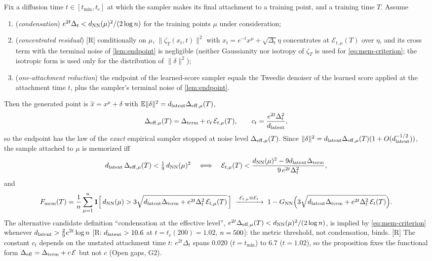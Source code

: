 \begin{proposition}\label{prop:bridge}
Fix a diffusion time $t\in[t_{\min},t_c]$ at which the sampler makes its final attachment to a training point, and a training time $T$. Assume
\begin{enumerate}
\item[(B1)] (\emph{condensation}) $e^{2t}\Delta_t<d_{\rm NN}(\mu)^2/(2\log n)$ for the training points $\mu$ under consideration;
\item[(B2)] (\emph{concentrated residual}) [R] conditionally on $\mu$, $\|\zeta_T(x_t,t)\|^2$ with $x_t=e^{-t}x^\mu+\sqrt{\Delta_t}\eta$ concentrates at $\mathcal E_{t,\mu}(T)$ over $\eta$, and its cross term with the terminal noise of \cref{lem:endpoint} is negligible (neither Gaussianity nor isotropy of $\zeta_T$ is used for \eqref{eq:mem-criterion}; the isotropic form is used only for the distribution of $\|\delta\|^2$);
\item[(B3)] (\emph{one-attachment reduction}) the endpoint of the learned-score sampler equals the Tweedie denoiser of the learned score applied at the attachment time $t$, plus the sampler's terminal noise of \cref{lem:endpoint}.
\end{enumerate}
Then the generated point is $\hat x=x^\mu+\delta$ with $\mathbb{E}\|\delta\|^2=d_{\mathrm{latent}}\Delta_{\rm eff,\mu}(T)$,
\begin{equation}\label{eq:Deff}
 \Delta_{\rm eff,\mu}(T)=\Delta_{\rm term}+c_t\,\mathcal E_{t,\mu}(T),\qquad c_t=\frac{e^{2t}\Delta_t^{2}}{d_{\mathrm{latent}}},
\end{equation}
so the endpoint has the law of the \emph{exact} empirical sampler stopped at noise level $\Delta_{\rm eff,\mu}(T)$. Since $\|\delta\|^2=d_{\mathrm{latent}}\Delta_{\rm eff,\mu}(T)(1+O(d_{\mathrm{latent}}^{-1/2}))$, the sample attached to $\mu$ is memorized iff
\begin{equation}\label{eq:mem-criterion}
 d_{\mathrm{latent}}\,\Delta_{\rm eff,\mu}(T)<\tfrac19\,d_{\rm NN}(\mu)^2\quad\Longleftrightarrow\quad \mathcal E_{t,\mu}(T)<\frac{d_{\rm NN}(\mu)^2-9d_{\mathrm{latent}}\Delta_{\rm term}}{9\,e^{2t}\Delta_t^{2}} ,
\end{equation}
and
\begin{equation}\label{eq:Fmem}
 F_{\rm mem}(T)=\frac1{n}\sum_{\mu=1}^{n}\mathbf 1\Big[\,d_{\rm NN}(\mu)>3\sqrt{d_{\mathrm{latent}}\Delta_{\rm term}+e^{2t}\Delta_t^{2}\,\mathcal E_{t,\mu}(T)}\,\Big]\;\xrightarrow{\ \mathcal E_{t,\mu}\equiv\mathcal E_t\ }\;1-G_{\rm NN}\Big(3\sqrt{d_{\mathrm{latent}}\Delta_{\rm term}+e^{2t}\Delta_t^{2}\,\mathcal E_t(T)}\Big).
\end{equation}
The alternative candidate definition ``condensation at the effective level'', $e^{2t}\Delta_{\rm eff,\mu}(T)<d_{\rm NN}(\mu)^2/(2\log n)$, is implied by \eqref{eq:mem-criterion} whenever $d_{\mathrm{latent}}>\tfrac29e^{2t}\log n$ [R: $d_{\mathrm{latent}}>10.6$ at $t=t_c(200)=1.02$, $n=500$]: the metric threshold, not condensation, binds. [R] The constant $c_t$ depends on the unstated attachment time $t$: $e^{2t}\Delta_t$ spans $0.020$ ($t=t_{\min}$) to $6.7$ ($t=1.02$), so the proposition fixes the functional form $\Delta_{\rm eff}=\Delta_{\rm term}+c\,\mathcal E$ but not $c$ (Open gaps, G2).
\end{proposition}
